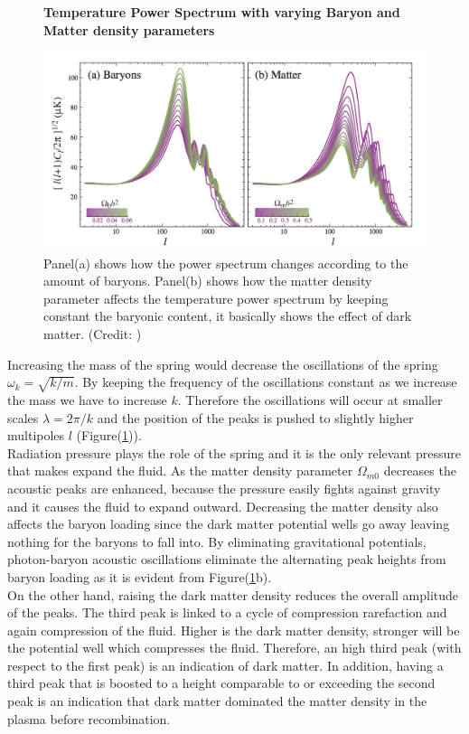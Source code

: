 \documentclass{article}
\begin{document}
\begin{figure}[H]
\centering
\textbf{Temperature Power Spectrum with varying Baryon and Matter density parameters}\par\medskip
\begin{center}
\includegraphics[width=\textwidth]{baryon_m}
\end{center}
\caption{Panel(a) shows how the power spectrum changes according to the amount of baryons. Panel(b) shows how the matter density parameter affects the temperature power spectrum by keeping constant the baryonic content, it basically shows the effect of dark matter. (Credit: \cite{huCosmicMicrowaveBackground2001})}
\label{DM_bary}
\end{figure}
\pagebreak
Increasing the mass of the spring would decrease the oscillations of the spring $\omega_k = \sqrt{k/m}$.
By keeping the frequency of the oscillations constant as we increase the mass we have to increase $k$.
Therefore the oscillations will occur at smaller scales $\lambda =2 \pi /k$ and the position of the peaks is pushed to slightly higher multipoles $l$ (Figure(\ref{DM_bary})).\\
%
Radiation pressure plays the role of the spring and it is the only relevant pressure that makes expand the fluid.
As the matter density parameter $\Omega_{m0}$ decreases the acoustic peaks are enhanced, because the pressure easily fights against gravity and it causes the fluid to expand outward.
Decreasing the matter density also affects the baryon loading since the dark matter potential wells go away leaving nothing for the baryons to fall into.
By eliminating gravitational potentials, photon-baryon acoustic oscillations eliminate the alternating peak heights from baryon loading \cite{huCosmicMicrowaveBackground2001} as it is evident from Figure(\ref{DM_bary}b).\\
On the other hand, raising the dark matter density reduces the overall amplitude of the peaks.
The third peak is linked to a cycle of compression rarefaction and again compression of the fluid.
Higher is the dark matter density, stronger will be the potential well which compresses the fluid.
Therefore, an high third peak (with respect to the first peak) is an indication of dark matter.
In addition, having a third peak that is boosted to a height comparable to or exceeding the second peak is an indication that dark matter dominated the matter density in the plasma before recombination.
\end{document}
